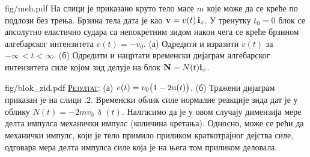 
\begin{slikaDesno}[.833]{fig/meh.pdf}
\PID 
На слици је приказано круто тело масе $m$ 
које може да се креће по подлози без трења. 
Брзина тела дата је као ${\bf v} = v(t) \, 
{\bf i}_x$. У тренутку $t_0 = 0$ блок се 
апсолутно еластично судара са 
непокретним зидом након чега 
се креће брзином алгебарског интензитета 
$v(t) = -v_0$. (а) Одредити и 
изразити $v(t)$ за $-\infty< t < \infty$. 
(б) Одредити и нацртати временски дијаграм
алгебарског интензитета  
силе којом зид делује на блок ${\bf N} = N(t) 
{\bf i}_x$.
\end{slikaDesno}
\vspace*{5mm}

\begin{slikaDesno}[1]{fig/blok_zid.pdf}
\hspace*{5mm}
\textsc{\underline{Резултат}}:
(а) $v(t) = v_0 \bigl(1 - 2{\rm u}(t)\bigr)$.
(б) Тражени дијаграм приказан је на слици \ID.2.
Временски облик силе нормалне реакције зида дат је у облику 
$N(t) = -2mv_0 \, \updelta(t)$. Налгасимо да је у овом случају димензија
мере делта импулса механички импулс (количина кретања). Односно, може се рећи да механички импулс, 
који је тело примило приликом краткотрајног дејства силе, одговара мера делта импулса силе која је на 
њега том приликом деловала.
\end{slikaDesno}